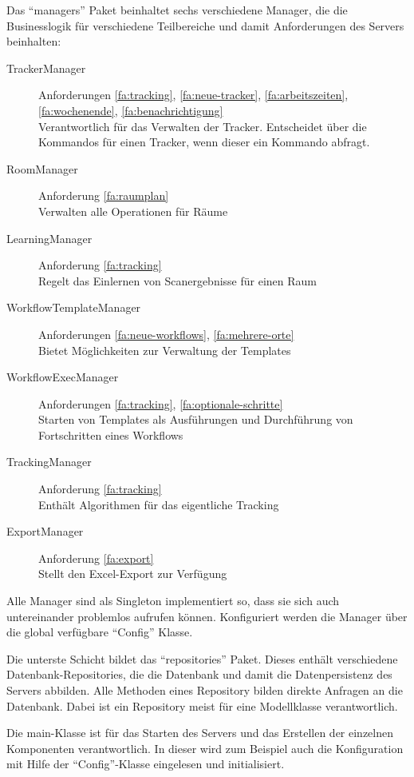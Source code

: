 Das \enquote{managers} Paket beinhaltet sechs verschiedene Manager, die die Businesslogik für verschiedene Teilbereiche 
und damit Anforderungen des Servers beinhalten:
\begin{description}
	\item[TrackerManager] Anforderungen \ref{fa:tracking}, \ref{fa:neue-tracker}, \ref{fa:arbeitszeiten}, \ref{fa:wochenende}, \ref{fa:benachrichtigung} \hfill \\
		Verantwortlich für das Verwalten der Tracker. Entscheidet über die Kommandos für einen Tracker, wenn dieser ein Kommando abfragt.
	\item[RoomManager] Anforderung \ref{fa:raumplan} \hfill \\
		Verwalten alle Operationen für Räume
	\item[LearningManager] Anforderung \ref{fa:tracking} \hfill \\
		Regelt das Einlernen von Scanergebnisse für einen Raum
	\item[WorkflowTemplateManager] Anforderungen \ref{fa:neue-workflows}, \ref{fa:mehrere-orte} \hfill \\
		Bietet Möglichkeiten zur Verwaltung der Templates
	\item[WorkflowExecManager] Anforderungen \ref{fa:tracking}, \ref{fa:optionale-schritte} \hfill \\
		Starten von Templates als Ausführungen und Durchführung von Fortschritten eines Workflows
	\item[TrackingManager] Anforderung \ref{fa:tracking} \hfill \\
		Enthält Algorithmen für das eigentliche Tracking
	\item[ExportManager] Anforderung \ref{fa:export} \hfill \\
		Stellt den Excel-Export zur Verfügung
\end{description}
Alle Manager sind als Singleton implementiert so, dass sie sich auch untereinander problemlos aufrufen können.
Konfiguriert werden die Manager über die global verfügbare \enquote{Config} Klasse.

Die unterste Schicht bildet das \enquote{repositories} Paket.
Dieses enthält verschiedene Datenbank-Repositories, die die Datenbank und damit die Datenpersistenz des Servers abbilden.
Alle Methoden eines Repository bilden direkte Anfragen an die Datenbank.
Dabei ist ein Repository meist für eine Modellklasse verantwortlich.

Die main-Klasse ist für das Starten des Servers und das Erstellen der einzelnen Komponenten verantwortlich.
In dieser wird zum Beispiel auch die Konfiguration mit Hilfe der \enquote{Config}-Klasse eingelesen und initialisiert.

